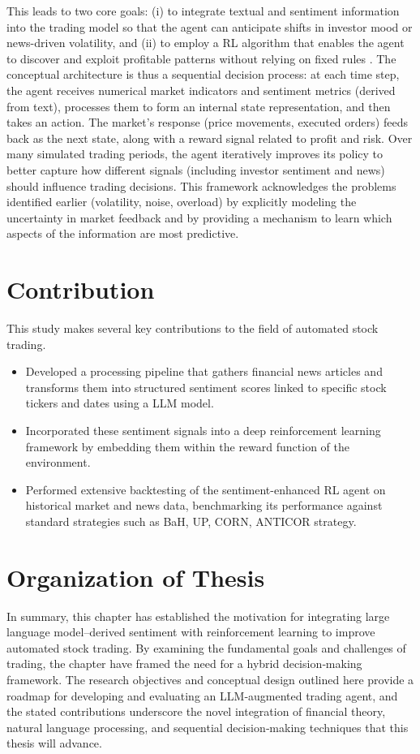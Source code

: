 This leads to two core goals: (i) to integrate textual and sentiment information into the trading model so that the agent can anticipate shifts in investor mood or news-driven volatility, and (ii) to employ a \gls{RL} algorithm that enables the agent to discover and exploit profitable patterns without relying on fixed rules \cite{Nevmyvaka2006}. The conceptual architecture is thus a sequential decision process: at each time step, the agent receives numerical market indicators and sentiment metrics (derived from text), processes them to form an internal state representation, and then takes an action. The market's response (price movements, executed orders) feeds back as the next state, along with a reward signal related to profit and risk. Over many simulated trading periods, the agent iteratively improves its policy to better capture how different signals (including investor sentiment and news) should influence trading decisions. This framework acknowledges the problems identified earlier (volatility, noise, overload) by explicitly modeling the uncertainty in market feedback and by providing a mechanism to learn which aspects of the information are most predictive.

\section{Contribution}
\label{sec:contribution}
This study makes several key contributions to the field of automated stock trading.

\begin{itemize}
  \item Developed a processing pipeline that gathers financial news articles and transforms them into structured sentiment scores linked to specific stock tickers and dates using a \gls{LLM} model.
  \item Incorporated these sentiment signals into a deep reinforcement learning framework by embedding them within the reward function of the environment.
  \item Performed extensive backtesting of the sentiment-enhanced RL agent on historical market and news data, benchmarking its performance against standard strategies such as \gls{BaH}, \gls{UP}, \gls{CORN}, \gls{ANTICOR} strategy.
\end{itemize}

\section{Organization of Thesis}

In summary, this chapter has established the motivation for integrating large language model–derived sentiment with reinforcement learning to improve automated stock trading. By examining the fundamental goals and challenges of trading, the chapter have framed the need for a hybrid decision‐making framework. The research objectives and conceptual design outlined here provide a roadmap for developing and evaluating an LLM‐augmented trading agent, and the stated contributions underscore the novel integration of financial theory, natural language processing, and sequential decision‐making techniques that this thesis will advance.
